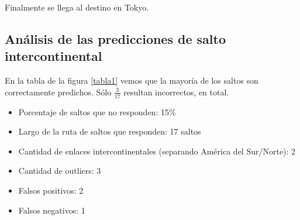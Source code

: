 Finalmente se llega al destino en Tokyo.

\subsection{Análisis de las predicciones de salto intercontinental}

En la tabla de la figura \ref{tabla1} vemos que la mayoría de los saltos son correctamente predichos. Sólo $\frac{3}{17}$ resultan incorrectos, en total.

\begin{itemize}
	\item Porcentaje de saltos que no responden: 15\%
	\item Largo de la ruta de saltos que responden: 17 saltos 
	\item Cantidad de enlaces intercontinentales (separando América del Sur/Norte): 2
	\item Cantidad de outliers: 3
	\item Falsos positivos: 2
	\item Falsos negativos: 1
\end{itemize}

